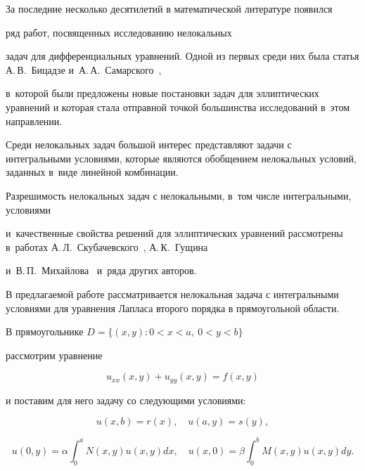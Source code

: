 За последние несколько десятилетий в математической литературе появился 

ряд работ, посвященных исследованию нелокальных

задач для дифференциальных уравнений. Одной из первых среди них была статья А.\,В.~Бицадзе и~А.\,А.~Самарского~\cite{bits}, 

в~которой были предложены новые постановки задач для эллиптических уравнений и которая стала отправной точкой большинства исследований в~этом направлении.



Среди нелокальных задач большой интерес представляют задачи с интегральными условиями, которые являются обобщением нелокальных условий, заданных в~виде линейной комбинации.

Разрешимость нелокальных задач с нелокальными, в~том числе интегральными, условиями

и~качественные свойства решений для эллиптических уравнений рассмотрены в~работах А.\,Л.~Скубачевского~\cite{skub}, А.\,К.~Гущина 

и~В.\,П.~Михайлова~\cite{mih, gusсh} и~ряда других авторов.



В предлагаемой работе рассматривается нелокальная задача с интегральными условиями для уравнения Лапласа второго порядка в прямоугольной области. 



\smallskip




В прямоугольнике $D=\{(x,y): 0<x<a,\ 0<y<b\}$

рассмотрим уравнение 

\begin{equation}\label{nvb:eq1}

 	u_{xx}(x,y)+u_{yy}(x,y)=f(x,y)

	\end{equation}

и поставим для него задачу со следующими условиями:

\begin{equation}\label{nvb:eq2}

	 u(x,b)=r(x), \quad u(a,y)=s(y),

	\end{equation}

	\begin{equation}\label{nvb:eq3}

 	 u(0,y)=\alpha\int_0^aN(x,y)u(x,y)dx, \quad u(x,0)=\beta\int_0^bM(x,y)u(x,y)dy.

	\end{equation}

